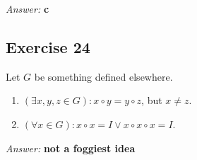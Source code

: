\documentclass[11pt]{article}
\begin{document}
\emph{Answer:} \textbf{c}
\subsection{Exercise 24}
\label{sec-2-24}
Let $G$ be something defined elsewhere.
\begin{enumerate}
\item $(\exists x, y, z \in G): x \circ y = y \circ z$, but $x \neq z$.
\item $(\forall x \in G): x \circ x = I \lor x \circ x \circ x = I$.
\end{enumerate}

\emph{Answer:} \textbf{not a foggiest idea}
\end{document}
